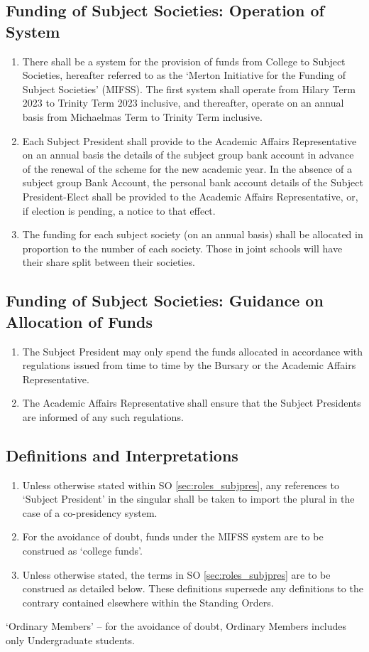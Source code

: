 \subsection{Funding of Subject Societies: Operation of System} \label{ssec:roles_subjpres_funding}
\begin{enumerate}
    \item There shall be a system for the provision of funds from College to Subject Societies, hereafter referred to as the `Merton Initiative for the Funding of Subject Societies' (MIFSS). The first system shall operate from Hilary Term 2023 to Trinity Term 2023 inclusive, and thereafter, operate on an annual basis from Michaelmas Term to Trinity Term inclusive.
    \item Each Subject President shall provide to the Academic Affairs Representative on an annual basis the details of the subject group bank account in advance of the renewal of the scheme for the new academic year. In the absence of a subject group Bank Account, the personal bank account details of the Subject President-Elect shall be provided to the Academic Affairs Representative, or, if election is pending, a notice to that effect.
    \item The funding for each subject society (on an annual basis) shall be allocated in proportion to the number of each society. Those in joint schools will have their share split between their societies.
\end{enumerate}
\subsection{Funding of Subject Societies: Guidance on Allocation of Funds} \label{ssec:roles_subjpres_fundingguidance}
\begin{enumerate}
    \item The Subject President may only spend the funds allocated in accordance with regulations issued from time to time by the Bursary or the Academic Affairs Representative.
    \item The Academic Affairs Representative shall ensure that the Subject Presidents are informed of any such regulations.
\end{enumerate}
\subsection{Definitions and Interpretations}
\begin{enumerate}
    \item Unless otherwise stated within SO \ref{sec:roles_subjpres}, any references to `Subject President' in the singular shall be taken to import the plural in the case of a co-presidency system.
    \item For the avoidance of doubt, funds under the MIFSS system are to be construed as `college funds'.
    \item Unless otherwise stated, the terms in SO \ref{sec:roles_subjpres} are to be construed as detailed below. These definitions supersede any definitions to the contrary contained elsewhere within the Standing Orders.
\end{enumerate}
`Ordinary Members' – for the avoidance of doubt, Ordinary Members includes only Undergraduate students.

